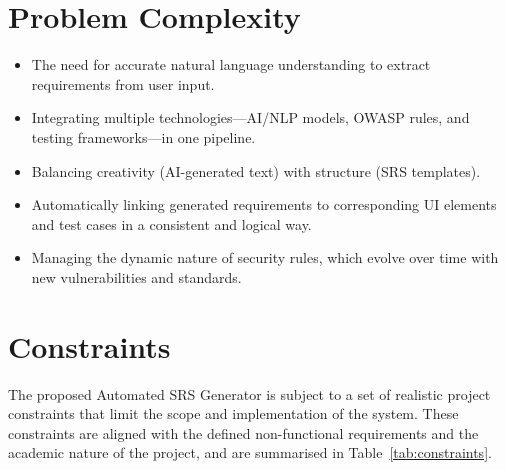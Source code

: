 \documentclass[12pt,a4paper,oneside]{report}
\begin{document}
\section{Problem Complexity}
\begin{itemize}[leftmargin=*]
  \item The need for accurate natural language understanding to extract requirements from user input.
  \item Integrating multiple technologies---AI/NLP models, OWASP rules, and testing frameworks---in one pipeline.
  \item Balancing creativity (AI-generated text) with structure (SRS templates).
  \item Automatically linking generated requirements to corresponding UI elements and test cases in a consistent and logical way.
  \item Managing the dynamic nature of security rules, which evolve over time with new vulnerabilities and standards.
\end{itemize}

\section{Constraints}
The proposed Automated SRS Generator is subject to a set of realistic project constraints that limit the scope and implementation of the system. These constraints are aligned with the defined non-functional requirements and the academic nature of the project, and are summarised in Table~\ref{tab:constraints}.
\end{document}
